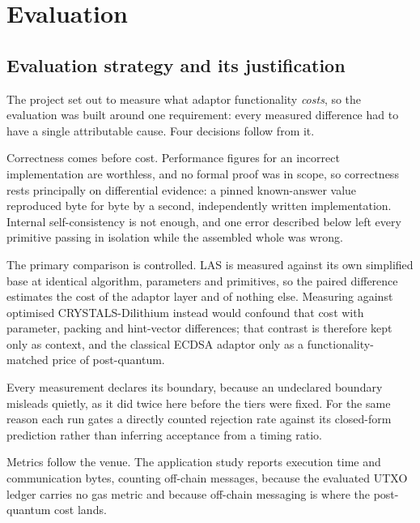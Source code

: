 \chapter{Evaluation}
\label{ch:evaluation}

\section{Evaluation strategy and its justification}
\label{sec:eval-strategy}

The project set out to measure what adaptor functionality \emph{costs}, so the evaluation
was built around one requirement: every measured difference had to have a single
attributable cause. Four decisions follow from it.

Correctness comes before cost. Performance figures for an incorrect implementation are
worthless, and no formal proof was in scope, so correctness rests principally on
differential evidence: a pinned known-answer value reproduced byte for byte by a second,
independently written implementation. Internal self-consistency is not enough, and one
error described below left every primitive passing in isolation while the assembled whole
was wrong.

The primary comparison is controlled. LAS is measured against its own simplified base at
identical algorithm, parameters and primitives, so the paired difference estimates the
cost of the adaptor layer and of nothing else. Measuring against optimised
CRYSTALS-Dilithium instead would confound that cost with parameter, packing and
hint-vector differences; that contrast is therefore kept only as context, and the
classical ECDSA adaptor only as a functionality-matched price of post-quantum.

Every measurement declares its boundary, because an undeclared boundary misleads quietly,
as it did twice here before the tiers were fixed. For the same reason each run gates a
directly counted rejection rate against its closed-form prediction rather than inferring
acceptance from a timing ratio.

Metrics follow the venue. The application study reports execution time and communication
bytes, counting off-chain messages, because the evaluated UTXO ledger carries no gas
metric and because off-chain messaging is where the post-quantum cost lands.

